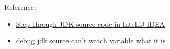 \documentclass[12pt]{article}
\begin{document}
Reference:

\begin{itemize}
\tightlist
\item
  \href{https://stackoverflow.com/questions/1313922/step-through-jdk-source-code-in-intellij-idea}{Step through JDK source code in IntelliJ IDEA}
\item
  \href{https://stackoverflow.com/questions/18255474/debug-jdk-source-cant-watch-variable-what-it-is}{debug jdk source can't watch variable what it is}
\end{itemize}
\end{document}
